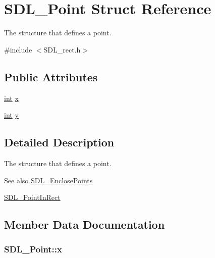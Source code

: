 \hypertarget{struct_s_d_l___point}{}\section{S\+D\+L\+\_\+\+Point Struct Reference}
\label{struct_s_d_l___point}


The structure that defines a point.  




{\ttfamily \#include $<$S\+D\+L\+\_\+rect.\+h$>$}

\subsection*{Public Attributes}
\begin{DoxyCompactItemize}
\item 
\hyperlink{_s_d_l__thread_8h_a6a64f9be4433e4de6e2f2f548cf3c08e}{int} \hyperlink{struct_s_d_l___point_a2ee987d59888024771c8d83aec43056c}{x}
\item 
\hyperlink{_s_d_l__thread_8h_a6a64f9be4433e4de6e2f2f548cf3c08e}{int} \hyperlink{struct_s_d_l___point_aaa68aefa869f6bdf46367a70bd9414b0}{y}
\end{DoxyCompactItemize}


\subsection{Detailed Description}
The structure that defines a point. 

\begin{DoxySeeAlso}{See also}
\hyperlink{_s_d_l__rect_8h_afcbb58dbba760b9e6fdb4b5d1ece015c}{S\+D\+L\+\_\+\+Enclose\+Points} 

\hyperlink{_s_d_l__rect_8h_a2f9708f2739ef234c34e6feda50b4d2c}{S\+D\+L\+\_\+\+Point\+In\+Rect} 
\end{DoxySeeAlso}


\subsection{Member Data Documentation}
\subsubsection[{\texorpdfstring{x}{x}}]{ S\+D\+L\+\_\+\+Point\+::x}\hypertarget{struct_s_d_l___point_a2ee987d59888024771c8d83aec43056c}{}\label{struct_s_d_l___point_a2ee987d59888024771c8d83aec43056c}
